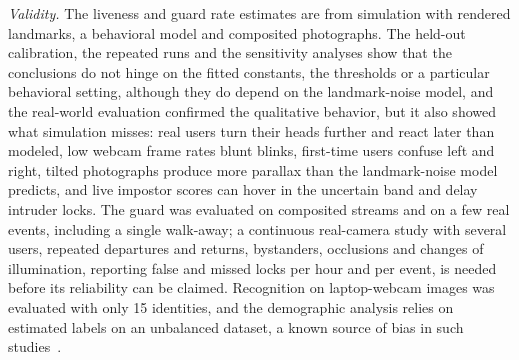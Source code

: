 \documentclass[journal]{IEEEtran}
\begin{document}
\emph{Validity.} The liveness and guard rate estimates are from simulation with rendered landmarks, a behavioral model and composited photographs. The held-out calibration, the repeated runs and the sensitivity analyses show that the conclusions do not hinge on the fitted constants, the thresholds or a particular behavioral setting, although they do depend on the landmark-noise model, and the real-world evaluation confirmed the qualitative behavior, but it also showed what simulation misses: real users turn their heads further and react later than modeled, low webcam frame rates blunt blinks, first-time users confuse left and right, tilted photographs produce more parallax than the landmark-noise model predicts, and live impostor scores can hover in the uncertain band and delay intruder locks. The guard was evaluated on composited streams and on a few real events, including a single walk-away; a continuous real-camera study with several users, repeated departures and returns, bystanders, occlusions and changes of illumination, reporting false and missed locks per hour and per event, is needed before its reliability can be claimed. Recognition on laptop-webcam images was evaluated with only 15 identities, and the demographic analysis relies on estimated labels on an unbalanced dataset, a known source of bias in such studies~\cite{drozdowski2020bias}.

\end{document}
